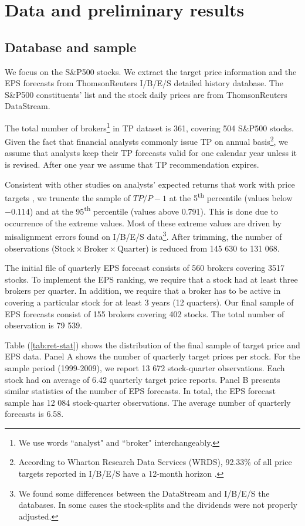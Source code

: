 \documentclass{article}
\begin{document}
\section{Data and preliminary results}
\label{sec:rankings}

\subsection{Database and sample}
We focus on the  S\&P500 stocks. We extract the target price information and the EPS forecasts from ThomsonReuters  I/B/E/S detailed history database. The  S\&P500 constituents' list and the stock daily prices are from ThomsonReuters DataStream.


The total number of brokers\footnote{We use words ``analyst" and ``broker" interchangeably.} in TP dataset is 361, covering 504 S\&P500 stocks. Given the fact that financial analysts commonly issue TP on annual basis\footnote{According to Wharton Research Data Services (WRDS), 92.33\% of all price targets reported in I/B/E/S have a 12-month horizon \citep{glushkov2009}.}, we assume that analysts keep their TP forecasts valid for one calendar year unless it is revised. After one year we assume that TP recommendation expires.

Consistent with other studies on analysts' expected returns that work with price targets  \citep{bradshaw2002,brav2003,da2011}, we truncate the sample of $TP/P-1$ at the 5\textsuperscript{th} percentile (values below \ensuremath{-0.114}) and at the 95\textsuperscript{th} percentile (values above 0.791). This is done due to occurrence of the extreme values. Most of these extreme values are driven by misalignment errors found on I/B/E/S data\footnote{We found some differences between the  DataStream and I/B/E/S the databases. In some cases the stock-splits and the dividends were not properly adjusted.}. After trimming, the number of observations ($\mathrm{Stock} \times \mathrm{Broker} \times  \mathrm{Quarter}$) is reduced  from 145 630 to 131 068.

The initial file of quarterly EPS forecast consists of  560 brokers covering 3517 stocks. To implement the EPS ranking, we require that a stock had at least three brokers per quarter. In addition, we require that a broker has to be active in covering a particular stock for at least 3 years (12 quarters). Our final sample of EPS forecasts consist of  155 brokers covering 402 stocks. The total number of observation is 79 539.
 

Table (\ref{tab:ret-stat}) shows the distribution of the final sample of target price and EPS data. Panel A shows the number of quarterly target prices per stock. For the sample period (1999-2009), we report 13 672 stock-quarter observations. Each stock had on average of 6.42 quarterly target price reports. Panel B  presents similar statistics of the number of EPS forecasts. In total, the EPS forecast sample has 12 084 stock-quarter observations. The average number of quarterly forecasts is 6.58.
\end{document}
